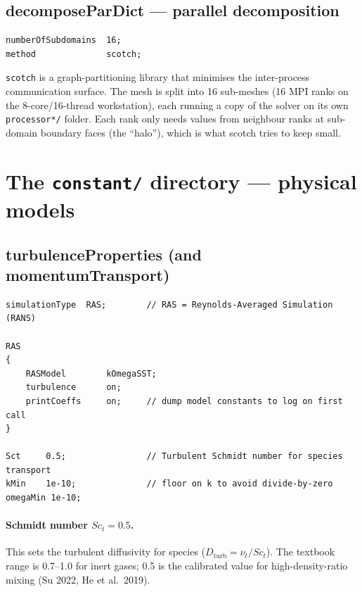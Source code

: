 \documentclass[11pt,a4paper]{article}
\begin{document}
\subsection{decomposeParDict --- parallel decomposition}

\begin{lstlisting}[style=foamstyle,caption={\texttt{system/decomposeParDict} (full)}]
numberOfSubdomains  16;
method              scotch;
\end{lstlisting}

\texttt{scotch} is a graph-partitioning library that minimises the
inter-process communication surface. The mesh is split into 16
sub-meshes (16 MPI ranks on the 8-core/16-thread workstation), each
running a copy of the solver on its own \texttt{processor*/} folder.
Each rank only needs values from neighbour ranks at sub-domain
boundary faces (the ``halo''), which is what scotch tries to keep
small.

\clearpage
\section{The \texttt{constant/} directory --- physical models}

\subsection{turbulenceProperties (and momentumTransport)}

\begin{lstlisting}[style=foamstyle,caption={\texttt{constant/turbulenceProperties} (full)}]
simulationType  RAS;        // RAS = Reynolds-Averaged Simulation (RANS)

RAS
{
    RASModel        kOmegaSST;
    turbulence      on;
    printCoeffs     on;     // dump model constants to log on first call
}

Sct     0.5;                // Turbulent Schmidt number for species transport
kMin    1e-10;              // floor on k to avoid divide-by-zero
omegaMin 1e-10;
\end{lstlisting}

\paragraph{Schmidt number $Sc_t = 0.5$.}
This sets the turbulent diffusivity for species
($D_\mathrm{turb} = \nu_t / Sc_t$). The textbook range is 0.7--1.0
for inert gases; 0.5 is the calibrated value for high-density-ratio
mixing (Su 2022, He et al.\ 2019).
\end{document}
